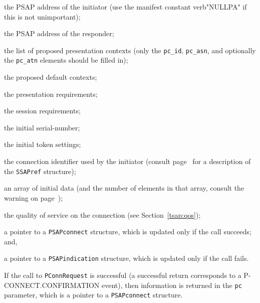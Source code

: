 \begin{describe}
\item[\verb"calling":] the PSAP address of the initiator
(use the manifest constant verb"NULLPA" if this is not unimportant);

\item[\verb"called":] the PSAP address of the responder;

\item[\verb"ctxlist":] the list of proposed presentation contexts
(only the \verb"pc_id", \verb"pc_asn", and optionally the \verb"pc_atn"
elements should be filled in);

\item[\verb"defctxname":] the proposed default contexts;

\item[\verb"prequirements":] the presentation requirements;

\item[\verb"srequirements":] the session requirements;

\item[\verb"isn":] the initial serial-number;

\item[\verb"settings":] the initial token settings;

\item[\verb"ref":] the connection identifier used by the initiator
(consult page~\pageref{SSAPref} for a description of the \verb"SSAPref"
structure);

\item[\verb"data"/\verb"ndata":] an array of initial data
(and the number of elements in that array,
consult the warning on page~\pageref{PSAPdata});

\item[\verb"qos":] the quality of service on the connection
(see Section~\ref{tsap:qos});

\item[\verb"pc":] a pointer to a \verb"PSAPconnect" structure, which is
updated only if the call succeeds;
and,

\item[\verb"pi":] a pointer to a \verb"PSAPindication" structure, which is
updated only if the call fails.
\end{describe}
If the call to \verb"PConnRequest" is successful
(a successful return corresponds to a {\sf P-CONNECT.CONFIRMATION\/} event),
then information is returned in the \verb"pc" parameter,
which is a pointer to a \verb"PSAPconnect" structure.
